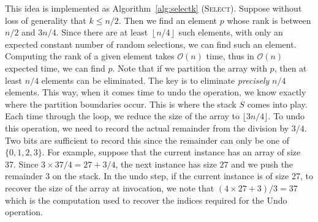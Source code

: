 \documentclass{elsart}
\newcommand{\Oh}[1]{\ensuremath{\mathcal{O}(#1)}}
\newcommand{\floor}[1]{\left\lfloor #1 \right\rfloor}
\begin{document}
This idea is implemented as Algorithm~\ref{alg:selectk}
(\textsc{Select}).  Suppose without loss of generality that $k\le
n/2$.  Then we find an element $p$ whose rank is between $n/2$ and
$3n/4$.  Since there are at least $\floor{n/4}$ such elements, with
only an expected constant number of random selections, we can find
such an element.  Computing the rank of a given element takes \Oh{n}
time, thus in \Oh{n} expected time, we can find $p$. Note that if we
partition the array with $p$, then at least $n/4$ elements can be
eliminated.  The key is to eliminate {\em precisely} $n/4$ elements.
This way, when it comes time to undo the operation, we know exactly
where the partition boundaries occur. This is where the stack $S$
comes into play.  Each time through the loop, we reduce the size of
the array to $\lfloor 3n/4 \rfloor$. To undo this operation, we need
to record the actual remainder from the division by $3/4$. Two bits
are sufficient to record this since the remainder can only be one of
$\{0, 1, 2, 3\}$.  For example, suppose that the current instance has
an array of size 37.  Since $3\times 37/4 = 27+3/4$, the next instance
has size $27$ and we push the remainder $3$ on the stack.  In the undo
step, if the current instance is of size 27, to recover the size of
the array at invocation, we note that $(4\times 27 + 3)/3 = 37$ which
is the computation used to recover the indices required for the Undo
operation.
\end{document}
